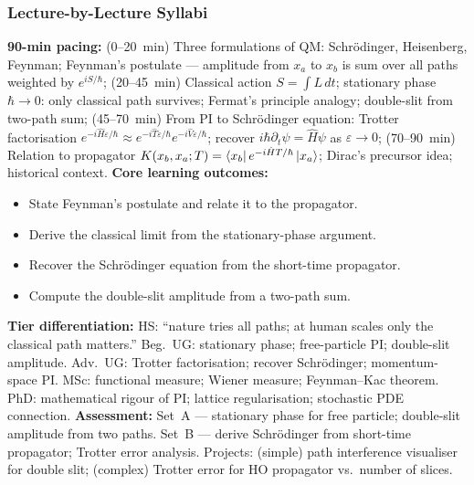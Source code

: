 \documentclass[11pt,a4paper]{article}
\begin{document}
\subsubsection*{Lecture-by-Lecture Syllabi}

\begin{tcolorbox}[modulebox, title={Module~II.2 --- Lecture L01: Feynman's Postulate}]
\textbf{90-min pacing:} (0--20~min) Three formulations of QM: Schr\"odinger, Heisenberg, Feynman; Feynman's postulate --- amplitude from $x_a$ to $x_b$ is sum over all paths weighted by $e^{iS/\hbar}$; (20--45~min) Classical action $S=\int L\,dt$; stationary phase $\hbar\to 0$: only classical path survives; Fermat's principle analogy; double-slit from two-path sum; (45--70~min) From PI to Schr\"odinger equation: Trotter factorisation $e^{-i\hat{H}\varepsilon/\hbar}\approx e^{-i\hat{T}\varepsilon/\hbar}e^{-i\hat{V}\varepsilon/\hbar}$; recover $i\hbar\partial_t\psi=\hat{H}\psi$ as $\varepsilon\to 0$; (70--90~min) Relation to propagator $K(x_b,x_a;T)=\bra{x_b}e^{-i\hat{H}T/\hbar}\ket{x_a}$; Dirac's precursor idea; historical context.
\medskip\textbf{Core learning outcomes:}
\begin{itemize}[leftmargin=1.4em,topsep=2pt,itemsep=1pt]
  \item State Feynman's postulate and relate it to the propagator.
  \item Derive the classical limit from the stationary-phase argument.
  \item Recover the Schr\"odinger equation from the short-time propagator.
  \item Compute the double-slit amplitude from a two-path sum.
\end{itemize}
\medskip\textbf{Tier differentiation:}
HS: ``nature tries all paths; at human scales only the classical path matters.''
Beg.\ UG: stationary phase; free-particle PI; double-slit amplitude.
Adv.\ UG: Trotter factorisation; recover Schr\"odinger; momentum-space PI.
MSc: functional measure; Wiener measure; Feynman--Kac theorem.
PhD: mathematical rigour of PI; lattice regularisation; stochastic PDE connection.
\medskip\textbf{Assessment:}
Set~A --- stationary phase for free particle; double-slit amplitude from two paths.
Set~B --- derive Schr\"odinger from short-time propagator; Trotter error analysis.
Projects: (simple) path interference visualiser for double slit; (complex) Trotter error for HO propagator vs.\ number of slices.
\end{tcolorbox}
\end{document}

